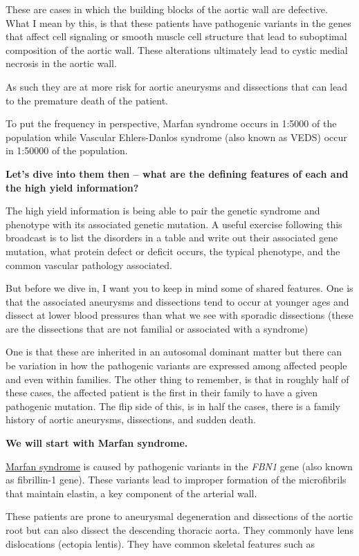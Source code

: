 \documentclass[
]{book}
\begin{document}
These are cases in which the building blocks of the aortic wall are
defective. What I mean by this, is that these patients have pathogenic
variants in the genes that affect cell signaling or smooth muscle cell
structure that lead to suboptimal composition of the aortic wall. These
alterations ultimately lead to cystic medial necrosis in the aortic
wall.

As such they are at more risk for aortic aneurysms and dissections that
can lead to the premature death of the patient.

To put the frequency in perspective, Marfan syndrome occurs in 1:5000 of
the population while Vascular Ehlers-Danlos syndrome (also known as
VEDS) occur in 1:50000 of the population.

\textbf{Let's dive into them then -- what are the defining features of each
and the high yield information?}

The high yield information is being able to pair the genetic syndrome
and phenotype with its associated genetic mutation. A useful exercise
following this broadcast is to list the disorders in a table and write
out their associated gene mutation, what protein defect or deficit
occurs, the typical phenotype, and the common vascular pathology
associated.

But before we dive in, I want you to keep in mind some of shared
features. One is that the associated aneurysms and dissections tend to
occur at younger ages and dissect at lower blood pressures than what we
see with sporadic dissections (these are the dissections that are not
familial or associated with a syndrome)

One is that these are inherited in an autosomal dominant matter but
there can be variation in how the pathogenic variants are expressed
among affected people and even within families. The other thing to
remember, is that in roughly half of these cases, the affected patient
is the first in their family to have a given pathogenic mutation. The
flip side of this, is in half the cases, there is a family history of
aortic aneurysms, dissections, and sudden death.

\textbf{We will start with Marfan syndrome.}

\uline{Marfan syndrome} is caused by pathogenic variants in the
\emph{FBN1} gene (also known as fibrillin-1 gene). These variants lead to
improper formation of the microfibrils that maintain elastin, a key
component of the arterial wall.

These patients are prone to aneurysmal degeneration and dissections of
the aortic root but can also dissect the descending thoracic aorta. They
commonly have lens dislocations (ectopia lentis). They have common
skeletal features such as
\end{document}
